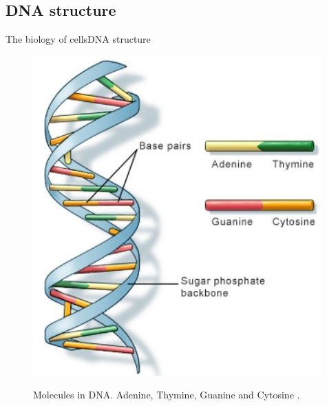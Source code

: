 \documentclass[10pt]{beamer}
\begin{document}
{%
\subsection{DNA structure}

\begin{frame}{The biology of cells}{DNA structure}
\begin{figure}[]
 \centering
    \includegraphics[width=\textwidth,height=0.7\textheight,keepaspectratio]{img/introduction/bio6.jpg}
    \label{img:mot2}
    \caption{Molecules in DNA. Adenine, Thymine, Guanine and Cytosine \cite{dna2020located}.}
\end{figure}
\end{frame}

}
\end{document}
